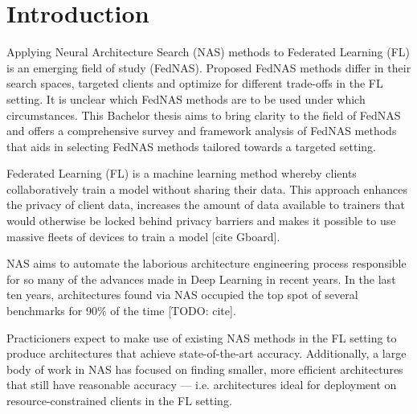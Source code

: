 \chapter{Introduction}\label{chapter:introduction}






Applying Neural Architecture Search (NAS) methods to Federated Learning (FL) is an emerging field of study (FedNAS). Proposed FedNAS methods differ in their search spaces, targeted clients and optimize for different trade-offs in the FL setting. It is unclear which FedNAS methods are to be used under which circumstances. This Bachelor thesis aims to bring clarity to the field of FedNAS and offers a comprehensive survey and framework analysis of FedNAS methods that aids in selecting FedNAS methods tailored towards a targeted setting. 

Federated Learning (FL) is a machine learning method whereby clients collaboratively train a model without sharing their data. This approach enhances the privacy of client data, increases the amount of data available to trainers that would otherwise be locked behind privacy barriers and makes it possible to use massive fleets of devices to train a model [cite Gboard].

NAS aims to automate the laborious architecture engineering process responsible for so many of the advances made in Deep Learning in recent years. In the last ten years, architectures found via NAS occupied the top spot of several benchmarks for 90\% of the time [TODO: cite].

Practicioners expect to make use of existing NAS methods in the FL setting to produce architectures that achieve state-of-the-art accuracy. Additionally, a large body of work in NAS has focused on finding smaller, more efficient architectures that still have reasonable accuracy — i.e. architectures ideal for deployment on resource-constrained clients in the FL setting.

